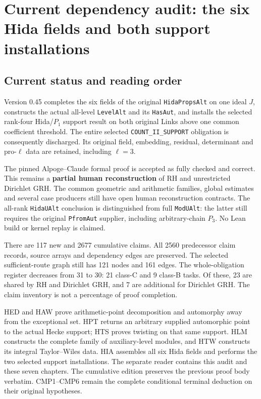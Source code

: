 \section{Current dependency audit: the six Hida fields and both support installations}
\label{sec:dependency-audit-v45}

\subsection{Current status and reading order}

Version 0.45 completes the six fields of the original
\texttt{Hida\allowbreak Props\allowbreak Alt} on one ideal $J$, constructs the actual
all-level \texttt{Level\allowbreak Alt} and its \texttt{Has\allowbreak Aut}, and installs
the selected rank-four Hida/$P_1$ support result on both original
Links above one common coefficient threshold.  The entire selected
\texttt{COUNT\_\allowbreak II\_\allowbreak SUPPORT} obligation is consequently discharged.
Its original field, embedding, residual, determinant and
pro-$\ell$ data are retained, including $\ell=3$.

The pinned Alpoge--Claude formal proof is accepted as fully checked
and correct.  This remains a \textbf{partial human reconstruction}
of RH and unrestricted Dirichlet GRH.  The common geometric and
arithmetic families, global estimates and several case producers
still have open human reconstruction contracts.  The all-rank
\texttt{Hida\allowbreak UAlt} conclusion is distinguished from full
\texttt{Mod\allowbreak UAlt}: the latter still requires the original
\texttt{Pfrom\allowbreak Aut} supplier, including arbitrary-chain $P_3$.
No Lean build or kernel replay is claimed.

There are 117 new and 2677 cumulative claims.  All 2560
predecessor claim records, source arrays and dependency edges are
preserved.  The selected sufficient-route graph still has 121 nodes
and 161 edges.  The whole-obligation register decreases from 31 to
30: 21 class-C and 9 class-B tasks.  Of these, 23 are shared by RH
and Dirichlet GRH, and 7 are additional for Dirichlet GRH.  The
claim inventory is not a percentage of proof completion.

HED and HAW prove arithmetic-point decomposition and automorphy
away from the exceptional set.  HPT returns an arbitrary supplied
automorphic point to the actual Hecke support; HTS proves twisting
on that same support.  HLM constructs the complete family of
auxiliary-level modules, and HTW constructs its integral
Taylor--Wiles data.  HIA assembles all six Hida fields and performs
the two selected support installations.  The separate reader
contains this audit and these seven chapters.  The cumulative
edition preserves the previous proof body verbatim.  CMP1--CMP6
remain the complete conditional terminal deduction on their
original hypotheses.

